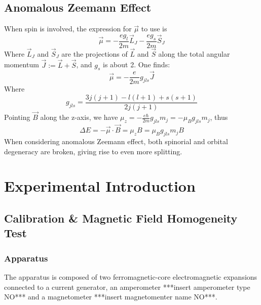 \documentclass[a4paper,12pt,abstracton]{scrartcl}
\begin{document}
\subsection{Anomalous Zeemann Effect}
When spin is involved, the expression for $\vec{\mu}$ to use is 
\begin{equation}
\vec{\mu}=-\frac{eg_l}{2m} \vec{L}_J - \frac{eg_s}{2m} \vec{S}_J
\end{equation}
Where $\vec{L}_J$ and $ \vec{S}_J$ are the projections of $\vec{L}$ and $\vec{S}$ along the total angular momentum $\vec{J}:= \vec{L}+ \vec{S}$, and $g_s$ is about 2. One finds:
\begin{equation}
\vec{\mu} = -\frac{e}{2m}g_{jls}\vec{J}
\end{equation}
Where 
\begin{equation}
g_{jls}=\frac{3j(j+1)-l(l+1)+s(s+1)}{2j(j+1)}
\end{equation}
Pointing $\vec{B}$ along the z-axis, we have $\mu_z =-\frac{e \hbar}{2m}g_{jls}m_j=-\mu_B g_{jls}m_j$, thus
\begin{equation}
\Delta E = -\vec{\mu}\cdot \vec{B}= \mu_z B = \mu_Bg_{jls}m_j B
\end{equation}
When considering anomalous Zeemann effect, both spinorial and orbital degeneracy are broken, giving rise to even more splitting.
\clearpage
\section{Experimental Introduction}\label{ExpIntro}
\subsection{Calibration \& Magnetic Field Homogeneity Test}
\subsubsection{Apparatus}
The apparatus is composed of two ferromagnetic-core electromagnetic expansions connected to a current generator, an amperometer ***insert amperometer type NO*** and a magnetometer ***insert magnetomenter name NO***.
\end{document}
